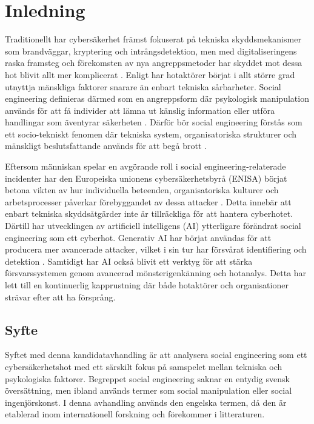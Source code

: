 \chapter{Inledning}
Traditionellt har cybersäkerhet främst fokuserat på tekniska skyddsmekanismer som brandväggar, kryptering och intrångsdetektion, men med digitaliseringens raska 
framsteg och förekomsten av nya angreppsmetoder har skyddet mot dessa hot blivit allt mer komplicerat \cite{cybersakerhet_kommuner}. Enligt \cite{heartfield_loukas_se, algarni2019se_survey} 
har hotaktörer börjat i allt större grad utnyttja mänskliga faktorer snarare än enbart tekniska sårbarheter. Social engineering definieras därmed som en angreppsform där psykologisk manipulation 
används för att få individer att lämna ut känslig information eller utföra handlingar som äventyrar säkerheten \cite{psychology_social_engineering}. Därför bör social engineering förstås som ett 
socio-tekniskt fenomen där tekniska system, organisatoriska strukturer och mänskligt beslutsfattande används för att begå brott \cite{washo2021interdisciplinary}.

Eftersom människan spelar en avgörande roll i social engineering-relaterade incidenter har den Europeiska unionens cybersäkerhetsbyrå (ENISA) börjat betona vikten av hur individuella beteenden, 
organisatoriska kulturer och arbetsprocesser påverkar förebyggandet av dessa attacker \cite{enisa2018cybersecurity_culture}. Detta innebär att enbart tekniska skyddsåtgärder inte är tillräckliga 
för att hantera cyberhotet. Därtill har utvecklingen av artificiell intelligens (AI) ytterligare förändrat social engineering som ett cyberhot. Generativ AI har börjat användas för att producera mer 
avancerade attacker, vilket i sin tur har försvårat identifiering och detektion \cite{zhang2024digital_deception}. Samtidigt har AI också blivit ett verktyg för att stärka försvarssystemen genom avancerad 
mönsterigenkänning och hotanalys. Detta har lett till en kontinuerlig kapprustning där både hotaktörer och organisationer strävar efter att ha försprång.

\section{Syfte}
Syftet med denna kandidatavhandling är att analysera social engineering som ett cybersäkerhetshot med ett särskilt fokus på samspelet mellan tekniska och psykologiska faktorer. 
Begreppet social engineering saknar en entydig svensk översättning, men ibland används termer som social manipulation eller social ingenjörskonst. I denna avhandling används den engelska termen, 
då den är etablerad inom internationell forskning och förekommer i litteraturen. 


